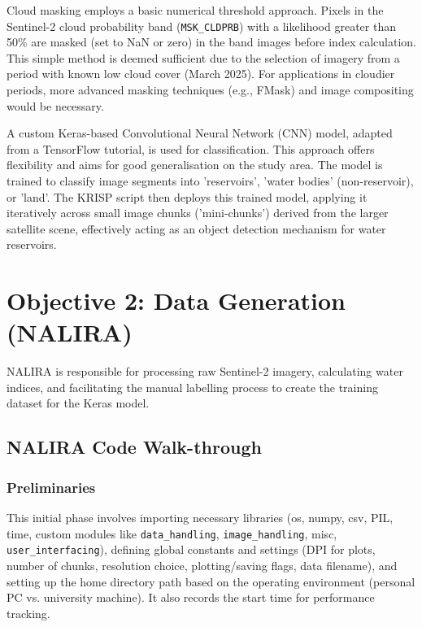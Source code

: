 Cloud masking employs a basic numerical threshold approach. Pixels in the Sentinel-2 cloud probability band (\verb|MSK_CLDPRB|) with a likelihood greater than 50\% are masked (set to NaN or zero) in the band images before index calculation. This simple method is deemed sufficient due to the selection of imagery from a period with known low cloud cover (March 2025). For applications in cloudier periods, more advanced masking techniques (e.g., FMask) and image compositing would be necessary.

A custom Keras-based Convolutional Neural Network (CNN) model, adapted from a TensorFlow tutorial, is used for classification. This approach offers flexibility and aims for good generalisation on the study area. The model is trained to classify image segments into 'reservoirs', 'water bodies' (non-reservoir), or 'land'. The KRISP script then deploys this trained model, applying it iteratively across small image chunks ('mini-chunks') derived from the larger satellite scene, effectively acting as an object detection mechanism for water reservoirs.

\section{Objective 2: Data Generation (NALIRA)}
NALIRA is responsible for processing raw Sentinel-2 imagery, calculating water indices, and facilitating the manual labelling process to create the training dataset for the Keras model.

\subsection{NALIRA Code Walk-through}

\subsubsection{Preliminaries}
This initial phase involves importing necessary libraries (os, numpy, csv, PIL, time, custom modules like \verb|data_handling|, \verb|image_handling|, misc, \verb|user_interfacing|), defining global constants and settings (DPI for plots, number of chunks, resolution choice, plotting/saving flags, data filename), and setting up the home directory path based on the operating environment (personal PC vs. university machine). It also records the start time for performance tracking.

